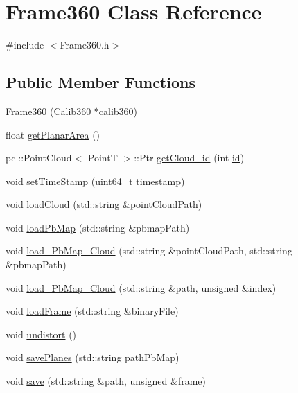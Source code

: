 \hypertarget{classFrame360}{\section{Frame360 Class Reference}
\label{classFrame360}
}


{\ttfamily \#include $<$Frame360.\-h$>$}

\subsection*{Public Member Functions}
\begin{DoxyCompactItemize}
\item 
\hyperlink{classFrame360_a1c58d80e556880e5e3a85bdaeba87147}{Frame360} (\hyperlink{classCalib360}{Calib360} $\ast$calib360)
\item 
float \hyperlink{classFrame360_a81e119e008557d3b46e633f80a1af23d}{get\-Planar\-Area} ()
\item 
pcl\-::\-Point\-Cloud$<$ Point\-T $>$\-::Ptr \hyperlink{classFrame360_a83516a0882727e759c64adfa8978bd8c}{get\-Cloud\-\_\-id} (int \hyperlink{classFrame360_a05b50a6279ddaa8b681bfb211bdc35b9}{id})
\item 
void \hyperlink{classFrame360_a21f73b26305b9538946ff41543db6caf}{set\-Time\-Stamp} (uint64\-\_\-t timestamp)
\item 
void \hyperlink{classFrame360_ab658d3c9fe71373112cc4d6e95e978b1}{load\-Cloud} (std\-::string \&point\-Cloud\-Path)
\item 
void \hyperlink{classFrame360_a1ac393ed6337d8514a01300a1a3f784b}{load\-Pb\-Map} (std\-::string \&pbmap\-Path)
\item 
void \hyperlink{classFrame360_a22f05e698a12d16b77ec4f0455d0f0a3}{load\-\_\-\-Pb\-Map\-\_\-\-Cloud} (std\-::string \&point\-Cloud\-Path, std\-::string \&pbmap\-Path)
\item 
void \hyperlink{classFrame360_a579da952130c84b30b4ed429a030110c}{load\-\_\-\-Pb\-Map\-\_\-\-Cloud} (std\-::string \&path, unsigned \&index)
\item 
void \hyperlink{classFrame360_aeb26a1cc5ad513dd01fc633f3a0a14df}{load\-Frame} (std\-::string \&binary\-File)
\item 
void \hyperlink{classFrame360_a1d33bd4c8b780f287b17f5e21c664238}{undistort} ()
\item 
void \hyperlink{classFrame360_aef8bf5c55662120f9be3c1f40bb1ee9f}{save\-Planes} (std\-::string path\-Pb\-Map)
\item 
void \hyperlink{classFrame360_a16a433d011354d31294f2bd141ec2a71}{save} (std\-::string \&path, unsigned \&frame)

\end{DoxyCompactItemize}
